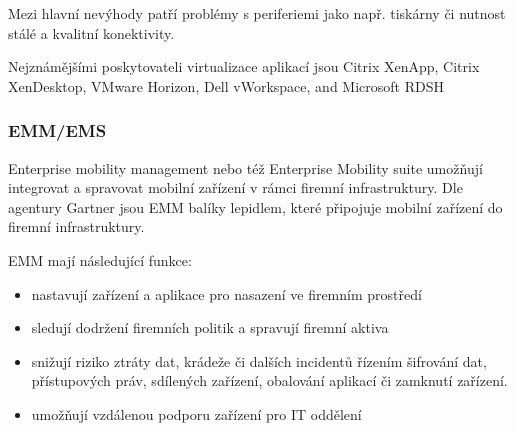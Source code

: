  Mezi hlavní nevýhody patří problémy s periferiemi jako např. tiskárny či nutnost stálé a kvalitní konektivity.
 
  Nejznámějšími poskytovateli virtualizace aplikací jsou Citrix XenApp, Citrix XenDesktop, VMware Horizon, Dell vWorkspace, and Microsoft RDSH
 
 
 \subsubsection{EMM/EMS}
 Enterprise mobility management nebo též Enterprise Mobility suite umožňují integrovat a spravovat mobilní zařízení v rámci firemní infrastruktury.
 Dle agentury Gartner jsou EMM balíky lepidlem, které připojuje mobilní zařízení do firemní infrastruktury. \cite{Gartner_EMM_2016}
 
 EMM mají následující funkce:
 \begin{itemize}
     \item nastavují zařízení a aplikace pro nasazení ve firemním prostředí
     \item sledují dodržení firemních politik a spravují firemní aktiva
     \item snižují riziko ztráty dat, krádeže či dalších incidentů řízením šifrování dat, přístupových práv, sdílených zařízení, obalování aplikací či zamknutí zařízení.
     \item umožňují vzdálenou podporu zařízení pro IT oddělení
 \end{itemize}
 

 
 
 
